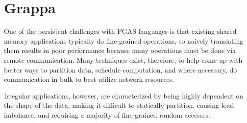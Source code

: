 \section{Grappa}

One of the persistent challenges with PGAS languages is that existing shared memory applications typically do  fine-grained operations, so naively translating them results in poor performance because many operations must be done via remote communication. Many techniques exist, therefore, to help come up with better ways to partition data, schedule computation, and where necessary, do communication in bulk to best utilize network resources.

Irregular applications, however, are characterized by being highly dependent on the shape of the data, making it difficult to statically partition, causing load imbalance, and requiring a majority of fine-grained random accesses.
